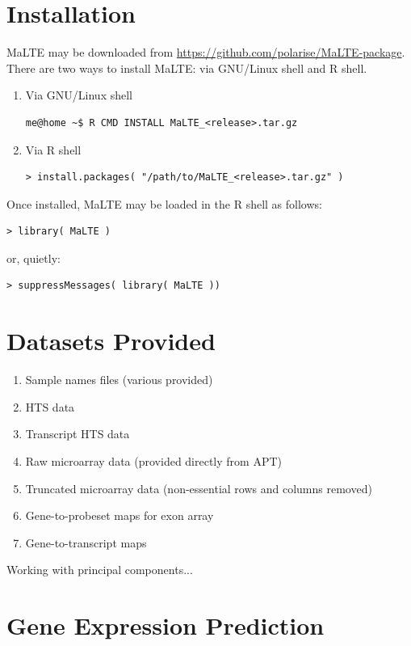 \documentclass[a4paper,12pt]{article}
\begin{document}
\section{Installation}
\label{installation}
\textsf{MaLTE} may be downloaded from \url{https://github.com/polarise/MaLTE-package}. There are two ways to install \textsf{MaLTE}: via GNU/Linux shell and \textsf{R} shell.

\begin{enumerate}
\item Via GNU/Linux shell
\begin{verbatim}
me@home ~$ R CMD INSTALL MaLTE_<release>.tar.gz
\end{verbatim}

\item Via \textsf{R} shell
\begin{verbatim}
> install.packages( "/path/to/MaLTE_<release>.tar.gz" )
\end{verbatim}
\end{enumerate}

Once installed, \textsf{MaLTE} may be loaded in the \textsf{R} shell as follows:
\begin{verbatim}
> library( MaLTE )
\end{verbatim}

or, quietly:

\begin{verbatim}
> suppressMessages( library( MaLTE ))
\end{verbatim}

\section{Datasets Provided}
\label{datasets}
\begin{enumerate}
\item Sample names files (various provided)
\item HTS data
\item Transcript HTS data
\item Raw microarray data (provided directly from APT)
\item Truncated microarray data (non-essential rows and columns removed)
\item Gene-to-probeset maps for exon array
\item Gene-to-transcript maps
\end{enumerate}

Working with principal components...

\section{Gene Expression Prediction}
\label{gep}
\end{document}
